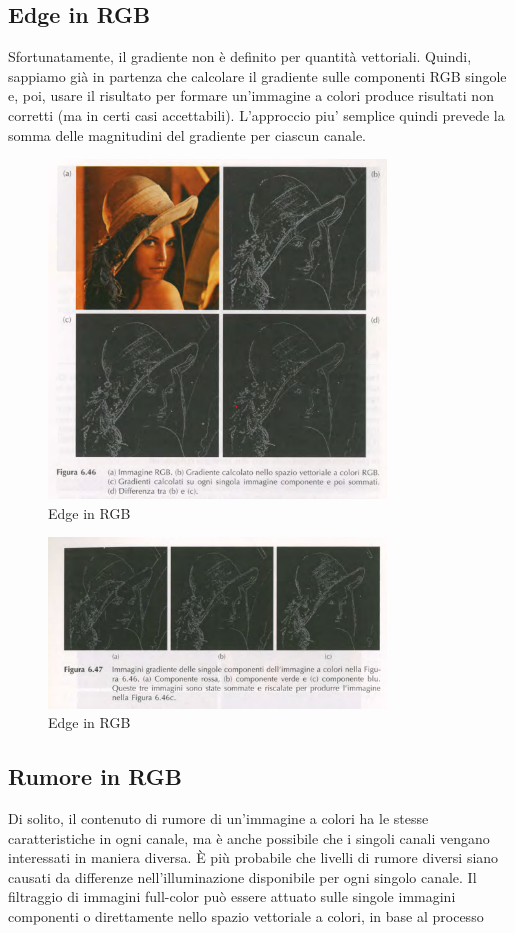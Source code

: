 \documentclass[12pt]{article}
\begin{document}
\subsection{Edge in RGB}
Sfortunatamente, il gradiente non è definito per quantità vettoriali. Quindi, sappiamo già in partenza che calcolare il gradiente sulle componenti RGB singole e, poi, usare il risultato per formare un'immagine a colori produce risultati non corretti (ma in certi casi accettabili). L’approccio piu’ semplice quindi prevede la somma delle magnitudini del gradiente per ciascun canale.
\begin{figure}[!htb]
    \centering
    \includegraphics[width=0.8\textwidth]{Images/edgecol.png}
    \caption{Edge in RGB}
\end{figure}
\FloatBarrier
\begin{figure}[!htb]
    \centering
    \includegraphics[width=0.8\textwidth]{Images/edgecol2.png}
    \caption{Edge in RGB}
\end{figure}
\FloatBarrier
\subsection{Rumore in RGB}
Di solito, il contenuto di rumore di un'immagine a colori ha le stesse caratteristiche in ogni canale, ma è anche possibile che i singoli canali vengano interessati in maniera diversa. È più probabile che livelli di rumore diversi siano causati da differenze nell'illuminazione disponibile per ogni singolo canale. Il filtraggio di immagini full-color può essere attuato sulle singole immagini componenti o direttamente nello spazio vettoriale a colori, in base al processo
\newpage
\end{document}
